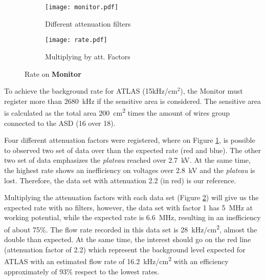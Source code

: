 	\begin{figure}[ht]
		\hspace*{\fill}
		\begin{subfigure}[b]{0.45\textwidth}
			\centering
			\texttt{[image: monitor.pdf]}
			\caption{Different attenuation filters}\label{fig:monrate}
		\end{subfigure}
		\hfill
		\begin{subfigure}[b]{0.45\textwidth}
			\centering
			\texttt{[image: rate.pdf]}
			\caption{Multiplying by att. Factors}\label{fig:filters}
		\end{subfigure}
		\hspace*{\fill}
		\caption{Rate on {\bf Monitor}}\label{}
	\end{figure}
	To achieve the background rate for ATLAS (\unit{15}{kHz/cm$^2$}), the Monitor must register more than \SI{2680}{kHz} if
	the sensitive area is considered. The sensitive area is calculated as the total area \SI{200}{cm^2} times the amount
	of wires group connected to the ASD (16 over 18).\par
	Four different attenuation factors were registered, where on Figure \ref{fig:monrate},
	is possible to observed two set of data over than the expected rate (red and blue). The other two set of data emphasizes the
	{\it plateau} reached over \SI{2.7}{kV}. At the same time, the highest rate shows an inefficiency on voltages over
	\SI{2.8}{kV} and the {\it plateau} is lost. Therefore, the data set with attenuation 2.2 (in red) is our reference.\par
	Multiplying the attenuation factors with each data set (Figure \ref{fig:filters}) will give us the expected rate with no
	filters, however, the data set with factor 1 has \SI{5}{MHz} at working potential, while the expected rate is
	\SI{6.6}{MHz}, resulting in an inefficiency of about 75\%. The flow rate recorded in this data set is \SI{28}{kHz/cm^2},
	almost the double than expected. At the same time, the interest should go on the red line (attenuation factor
	of 2.2) which represent the background level expected for ATLAS with an estimated flow rate of \SI{16.2}{kHz/cm^2} with
	an efficiency approximately of 93\% respect to the lowest rates.\par


